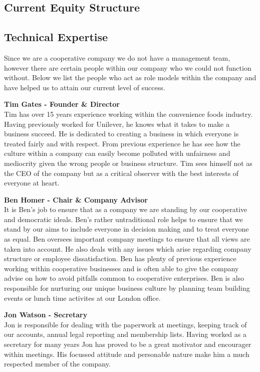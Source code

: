 \documentclass{article}
\begin{document}
  \subsection{Current Equity Structure}

  \subsection{Technical Expertise}

  Since we are a cooperative company we do not have a management team, however there are certain people within our company who we could not function without.
  Below we list the people who act as role models within the company and have helped us to attain our current level of success.

  {\bf Tim Gates - Founder \& Director} \\
  Tim has over 15 years experience working within the convenience foods industry. Having previously worked for Unilever, he knows what it takes to make a business succeed. He is dedicated to creating a business in which everyone is treated fairly and with respect. From previous experience he has see how the culture within a company can easily become polluted with unfairness and mediocrity given the wrong people or business structure. Tim sees himself not as the CEO of the company but as a critical observer with the best interests of everyone at heart.

  {\bf Ben Homer - Chair \& Company Advisor} \\
  It is Ben's job to ensure that as a company we are standing by our cooperative and democratic ideals. Ben's rather untraditional role helps to ensure that we stand by our aims to include everyone in decision making and to treat everyone as equal. Ben oversees important company meetings to ensure that all views are taken into account. He also deals with any issues which arise regarding company structure or employee dissatisfaction. Ben has plenty of previous experience working within cooperative businesses and is often able to give the company advise on how to avoid pitfalls common to cooperative enterprises. Ben is also responsible for nurturing our unique business culture by planning team building events or lunch time activites at our London office.

  {\bf Jon Watson - Secretary} \\
  Jon is responsible for dealing with the paperwork at meetings, keeping track of our accounts, annual legal reporting and membership lists. Having worked as a secretary for many years Jon has proved to be a great motivator and encourager within meetings. His focussed attitude and personable nature make him a much respected member of the company.
\end{document}
